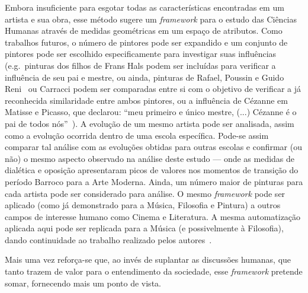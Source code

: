 Embora insuficiente para esgotar todas as características encontradas
em um artista e sua obra, esse método sugere um \textit{framework}
para o estudo das Ciências Humanas através de medidas geométricas em
um espaço de atributos.  Como trabalhos futuros, o número de pintores
pode ser expandido e um conjunto de pintores pode ser escolhido
especificamente para investigar suas influências (e.g.\ pinturas dos
filhos de Frans Hals podem ser incluídas para verificar a influência
de seu pai e mestre, ou ainda, pinturas de Rafael, Poussin e Guido
Reni~\cite{gombrich} ou Carracci podem ser comparadas entre si com o
objetivo de verificar a já reconhecida similaridade entre ambos
pintores, ou a influência de Cézanne em Matisse e Picasso, que
declarou: ``meu primeiro e único mestre, (...)  Cézanne é o pai de
todos nós''~\cite{rishel}). A evolução de um mesmo artista pode ser
analisada, assim como a evolução ocorrida dentro de uma escola
específica. Pode-se assim comparar tal análise com as evoluções
obtidas para outras escolas e confirmar (ou não) o mesmo aspecto
observado na análise deste estudo --- onde as medidas de dialética e
oposição apresentaram picos de valores nos momentos de transição do
período Barroco para a Arte Moderna. Ainda, um número maior de
pinturas para cada artista pode ser considerado para análise. O mesmo
\textit{framework} pode ser aplicado (como já demonstrado para a
Música, Filosofia e Pintura) a outros campos de interesse humano como
Cinema e Literatura. A mesma automatização aplicada aqui pode ser
replicada para a Música (e possivelmente à Filosofia), dando
continuidade ao trabalho realizado pelos autores~\cite{vieira}.

Mais uma vez reforça-se que, ao invés de suplantar as discussões
humanas, que tanto trazem de valor para o entendimento da sociedade,
esse \textit{framework} pretende somar, fornecendo mais um ponto de
vista.
